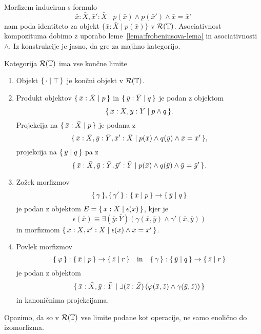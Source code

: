 \documentclass[../kategoricna_logika.tex]{subfiles}
\begin{document}
  \begin{opomba}
    Morfizem induciran s formulo
    $$\bar{x}:\bar{X}, \bar{x}':\bar{X} \mid p(\bar{x}) \land p(\bar{x}') \land \bar{x} = \bar{x}'$$
    nam poda identiteto za objekt $\{\bar{x}:\bar{X} \mid p(\bar{x})\}$ v $\mathcal{R}(\mathbb{T})$. Asociativnost kompozituma
    dobimo z uporabo leme~\ref{lema:frobeniusova-lema} in asociativnosti $\land$.
    Iz konstrukcije je jasno, da gre za majhno kategorijo.
  \end{opomba}
  \begin{lema}\label{lema:limite-v-sintaktični-kategoriji}
    Kategorija $\mathcal{R}(\mathbb{T})$ ima vse končne limite
    \begin{enumerate}[label=(\roman*)]
    \item Objekt $\lbrace\,\cdot  \mid  \top\,\rbrace$ je končni objekt v
      $\mathcal{R}(\mathbb{T})$.
    \item Produkt objektov $\lbrace\,\bar{x}:\bar{X} \mid  p\,\rbrace$ in
      $\lbrace\,\bar{y}:\bar{Y} \mid  q\,\rbrace$ je podan z objektom
      $$\lbrace\,\bar{x}:\bar{X},\bar{y}:\bar{Y} \mid  p \wedge q\,\rbrace.$$
      Projekcija na
      $\lbrace\,\bar{x}:\bar{X} \mid  p\,\rbrace$ je podana z
      $$\lbrace\,\bar{x}:\bar{X}, \bar{y}:\bar{Y},\bar{x}':\bar{X} \mid
        p(\bar{x}) \wedge q(\bar{y}) \wedge \bar{x} = \bar{x}'\,\rbrace,$$
      projekcija na $\lbrace\,\bar{y} \mid  q\,\rbrace$ pa z
      $$\lbrace\,\bar{x}:\bar{X},\bar{y}:\bar{Y},\bar{y}':\bar{Y} \mid
        p(\bar{x}) \wedge q(\bar{y}) \wedge \bar{y} = \bar{y}'\,\rbrace.$$
    \item Zožek morfizmov
      $$\lbrace\,\gamma\,\rbrace, \lbrace\,\gamma'\,\rbrace : \lbrace\,\bar{x} \mid  p\,\rbrace \to \lbrace\,\bar{y} \mid  q\,\rbrace$$
      je podan z objektom
      $E = \lbrace\,\bar{x}:\bar{X} \mid  \epsilon(\bar{x})\,\rbrace$, kjer je
      $$\epsilon(\bar{x}) \equiv \exists (\bar{y}:\bar{Y})\left(\gamma(\bar{x},\bar{y}) \wedge \gamma'(\bar{x},\bar{y})\right)$$
      in morfizmom
      $\lbrace\,\bar{x}:\bar{X},\bar{x}':\bar{X} \mid  \epsilon(\bar{x}) \wedge
        \bar{x} = \bar{x}'\,\rbrace$.
    \item Povlek morfizmov
      \[ \lbrace\,\varphi\,\rbrace : \lbrace\,\bar{x} \mid  p\,\rbrace \to \lbrace\,\bar{z} \mid  r\,\rbrace \quad \text{in} \quad
      \lbrace\,\gamma\,\rbrace : \lbrace\,\bar{y} \mid  q\,\rbrace \to \lbrace\,\bar{z} \mid  r\,\rbrace\]
      je podan z objektom
      $$\lbrace\,\bar{x}:\bar{X},\bar{y}:\bar{Y} \mid \exists (\bar{z}:\bar{Z}) \left(\varphi(\bar{x},\bar{z}) \wedge \gamma(\bar{y},\bar{z})\right)\,\rbrace$$
      in kanoničnima projekcijama.
    \end{enumerate}
  \end{lema}
  \begin{opomba}
    Opazimo, da so v $\mathcal{R}(\mathbb{T})$ vse limite podane kot operacije, ne
    samo enolično do izomorfizma.
  \end{opomba}
\end{document}
